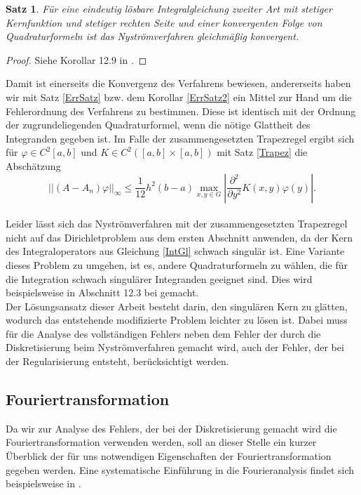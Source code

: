 \documentclass[12pt,a4paper]{scrartcl}
\newtheorem{Satz}{Satz}[section]
\numberwithin{equation}{section}
\begin{document}
\begin{Satz}
  Für eine eindeutig lösbare Integralgleichung  zweiter Art mit stetiger Kernfunktion und stetiger rechten Seite und einer konvergenten Folge von Quadraturformeln ist das Nyströmverfahren gleichmäßig konvergent.
\end{Satz}
\begin{proof}
  Siehe Korollar 12.9 in \cite{kress}.
\end{proof}
Damit ist einerseits die Konvergenz des Verfahrens bewiesen, andererseits haben wir mit Satz \ref{ErrSatz} bzw. dem Korollar \ref{ErrSatz2} ein Mittel zur Hand um die Fehlerordnung des Verfahrens zu bestimmen. Diese ist identisch mit der Ordnung der zugrundeliegenden Quadraturformel, wenn die nötige Glattheit des Integranden gegeben ist. Im Falle der zusammengesetzten Trapezregel ergibt sich für $\varphi \in C^2[a,b]$ und $K \in C^2([a,b]\times [a,b])$ mit Satz \ref{Trapez} die Abschätzung
\[
||(A-A_n)\varphi ||_\infty \leq \frac{1}{12}h^2(b-a) \operatorname{max}_{x,y\in G}\left| \frac{\partial^2}{\partial y^2}K(x,y) \varphi(y)\right|.
\]
\\
Leider lässt sich das Nyströmverfahren mit der zusammengesetzten Trapezregel nicht auf das Dirichletproblem aus dem ersten Abschnitt anwenden, da der Kern des Integraloperators aus Gleichung \eqref{IntGl} schwach singulär ist. Eine Variante dieses Problem zu umgehen, ist es, andere Quadraturformeln zu wählen, die für die Integration schwach singulärer Integranden geeignet sind. Dies wird beispielsweise in Abschnitt 12.3 bei \cite{kress} gemacht. 
\\ Der Lösungsansatz dieser Arbeit besteht darin, den singulären Kern zu glätten, wodurch das entstehende modifizierte Problem leichter zu lösen ist. Dabei muss für die Analyse des vollständigen Fehlers neben dem Fehler der durch die Diskretisierung beim Nyströmverfahren gemacht wird, auch der Fehler, der bei der Regularisierung entsteht, berücksichtigt werden.

\subsection{Fouriertransformation} 
Da wir zur Analyse des Fehlers, der bei der Diskretisierung gemacht wird die Fouriertransformation verwenden werden, soll an dieser Stelle ein kurzer Überblick der für uns notwendigen Eigenschaften der Fouriertransformation gegeben werden. Eine systematische Einführung in die Fourieranalysis findet sich beispielsweise in \cite{Grafakos}.
\end{document}
